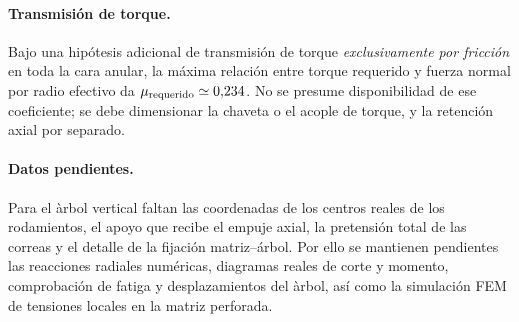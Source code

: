 \paragraph{Transmisi\'on de torque.}
Bajo una hip\'otesis adicional de transmisi\'on de torque \emph{exclusivamente por fricci\'on} en toda la cara anular, la m\'axima relaci\'on entre torque requerido y fuerza normal por radio efectivo da $\mu_{\rm requerido}\simeq0{,}234$. No se presume disponibilidad de ese coeficiente; se debe dimensionar la chaveta o el acople de torque, y la retenci\'on axial por separado.

\paragraph{Datos pendientes.}
Para el \`arbol vertical faltan las coordenadas de los centros reales de los rodamientos, el apoyo que recibe el empuje axial, la pretensi\'on total de las correas y el detalle de la fijaci\'on matriz--\'arbol. Por ello se mantienen pendientes las reacciones radiales num\'ericas, diagramas reales de corte y momento, comprobaci\'on de fatiga y desplazamientos del \`arbol, as\'i como la simulaci\'on FEM de tensiones locales en la matriz perforada.

